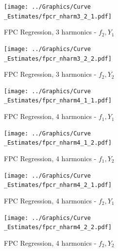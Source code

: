 \documentclass[11pt,twoside,a4paper]{article}
\begin{document}
	\begin{figure}[H]
		\centering
		\begin{minipage}{.5\textwidth}
			\centering
			\texttt{[image: ../Graphics/Curve\\\_Estimates/fpcr\_nharm3\_2\_1.pdf]}
			\caption{FPC Regression, 3 harmonics - $f_2, Y_1$}
			\label{fpcr_nharm3_2_1}
		\end{minipage}%
		\begin{minipage}{.5\textwidth}
			\centering
			\texttt{[image: ../Graphics/Curve\\\_Estimates/fpcr\_nharm3\_2\_2.pdf]}
			\caption{FPC Regression, 3 harmonics - $f_2, Y_2$}
			\label{fpcr_nharm3_2_2}
		\end{minipage}
	\end{figure}
	
	\begin{figure}[H]
		\centering
		\begin{minipage}{.5\textwidth}
			\centering
			\texttt{[image: ../Graphics/Curve\\\_Estimates/fpcr\_nharm4\_1\_1.pdf]}
			\caption{FPC Regression, 4 harmonics - $f_1, Y_1$}
			\label{fpcr_nharm4_1_1}
		\end{minipage}%
		\begin{minipage}{.5\textwidth}
			\centering
			\texttt{[image: ../Graphics/Curve\\\_Estimates/fpcr\_nharm4\_1\_2.pdf]}
			\caption{FPC Regression, 4 harmonics - $f_1, Y_2$}
			\label{fpcr_nharm4_1_2}
		\end{minipage}
	\end{figure}
	
	\begin{figure}[H]
		\centering
		\begin{minipage}{.5\textwidth}
			\centering
			\texttt{[image: ../Graphics/Curve\\\_Estimates/fpcr\_nharm4\_2\_1.pdf]}
			\caption{FPC Regression, 4 harmonics - $f_2, Y_1$}
			\label{fpcr_nharm4_2_1}
		\end{minipage}%
		\begin{minipage}{.5\textwidth}
			\centering
			\texttt{[image: ../Graphics/Curve\\\_Estimates/fpcr\_nharm4\_2\_2.pdf]}
			\caption{FPC Regression, 4 harmonics - $f_2, Y_2$}
			\label{fpcr_nharm4_2_2}
		\end{minipage}
	\end{figure}

\newpage

\end{document}
